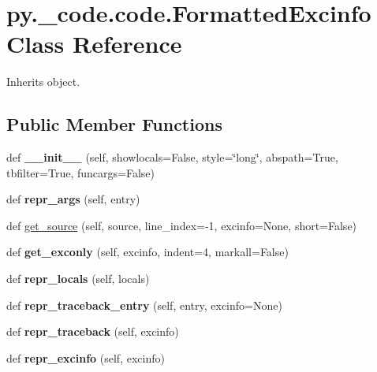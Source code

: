 \hypertarget{classpy_1_1__code_1_1code_1_1_formatted_excinfo}{}\section{py.\+\_\+code.\+code.\+Formatted\+Excinfo Class Reference}
\label{classpy_1_1__code_1_1code_1_1_formatted_excinfo}


Inherits object.

\subsection*{Public Member Functions}
\begin{DoxyCompactItemize}
\item 
\mbox{\label{classpy_1_1__code_1_1code_1_1_formatted_excinfo_a460818136bcd083fb4d6a2503c9a65ed}} 
def {\bfseries \+\_\+\+\_\+init\+\_\+\+\_\+} (self, showlocals=False, style=\char`\"{}long\char`\"{}, abspath=True, tbfilter=True, funcargs=False)
\item 
\mbox{\label{classpy_1_1__code_1_1code_1_1_formatted_excinfo_a627e6341f90713e3f20de8da28d40cb6}} 
def {\bfseries repr\+\_\+args} (self, entry)
\item 
def \hyperlink{classpy_1_1__code_1_1code_1_1_formatted_excinfo_a4474c8457b036ee2451cead0712ca631}{get\+\_\+source} (self, source, line\+\_\+index=-\/1, excinfo=None, short=False)
\item 
\mbox{\label{classpy_1_1__code_1_1code_1_1_formatted_excinfo_aa3f1a100ad03216655e997b0ccde761d}} 
def {\bfseries get\+\_\+exconly} (self, excinfo, indent=4, markall=False)
\item 
\mbox{\label{classpy_1_1__code_1_1code_1_1_formatted_excinfo_a053075a3c199aa7e5e8b814bcc95ab18}} 
def {\bfseries repr\+\_\+locals} (self, locals)
\item 
\mbox{\label{classpy_1_1__code_1_1code_1_1_formatted_excinfo_ac0b55e052d54153b2400e469c4a4f179}} 
def {\bfseries repr\+\_\+traceback\+\_\+entry} (self, entry, excinfo=None)
\item 
\mbox{\label{classpy_1_1__code_1_1code_1_1_formatted_excinfo_aa127deca5db9b8cbf9c0f7b6a4ddae93}} 
def {\bfseries repr\+\_\+traceback} (self, excinfo)
\item 
\mbox{\label{classpy_1_1__code_1_1code_1_1_formatted_excinfo_a10c535455f3053d366a1e8338d58a5ee}} 
def {\bfseries repr\+\_\+excinfo} (self, excinfo)
\end{DoxyCompactItemize}
